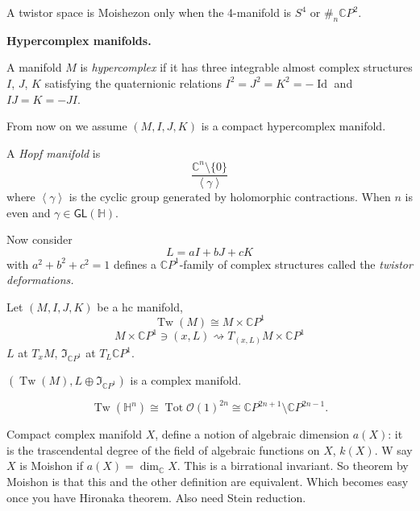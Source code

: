 \begin{theorem}[F. Campana]
\label{theorem-tw-campana}
A twistor space is Moishezon only when the
4-manifold is $S^4$ or $\#_n\mathbb{C}P^{2}$.
\end{theorem}

\medskip\noindent
{\bf Hypercomplex manifolds.}

\begin{definition}
\label{definition-tw-hypercomplex}
A manifold $M$ is {\it hypercomplex} if it
has three integrable almost complex
structures $I$, $J$, $K$ satisfying the
quaternionic relations
$I^2=J^2=K^2=-\operatorname{Id}$ and $I
J=K=-J I$.
\end{definition}

From now on we assume $(M,I,J,K)$ is a
compact hypercomplex manifold.

\begin{example}
\label{example-tw-hopf}
A {\it Hopf manifold} is
$$
\frac{\mathbb{C}^n\setminus
\{0\}}{\left\langle{} \gamma\right\rangle{}}
$$
where $\left\langle{} \gamma\right\rangle{}$
is the cyclic group generated by holomorphic
contractions. When $n$ is even and
$\gamma\in\mathsf{GL}(\mathbb{H})$.
\end{example}

Now consider
$$
L=a I+b J + c K
$$
with $a^2+b^2+c^2=1$ defines a
$\mathbb{C}P^{1}$-family of complex
structures called the {\it twistor
deformations.}

\begin{definition}
\label{definition-tw-twistor-space}
Let $(M,I,J,K)$ be a hc manifold,
$$
\operatorname{Tw}(M)\cong M\times
\mathbb{C}P^{1}
$$
$$
M\times \mathbb{C}P^{1}
\ni(x,L)\rightsquigarrow T_{(x,L)}M\times
\mathbb{C}P^{1}
$$
$L$ at $T_xM$,
$\mathfrak{I}_{\mathbb{C}P^{1}}$ at
$T_L\mathbb{C}P^{1}$.
\end{definition}

\begin{theorem}
\label{theorem-tw-salamon}
$(\operatorname{Tw}(M),L\oplus
\mathfrak{I}_{\mathbb{C}P^{1}})$ is a complex
manifold.
\end{theorem}

\begin{example}[HKCR]
\label{example-tw-hkcr}
$$
\operatorname{Tw}(\mathbb{H}^n)\cong
\operatorname{Tot}\mathcal{O}(1)^{2n}\cong
\mathbb{C}P^{2n+1}\setminus
\mathbb{C}P^{2n-1}.
$$
\end{example}

Compact complex manifold $X$, define a notion
of algebraic dimension $a(X)$: it is the
trascendental degree of the field of
algebraic functions on $X$, $k(X)$. W say $X$
is Moishon if $a(X)=\dim_\mathbb{C}X$. This
is a birrational invariant. So theorem by
Moishon is that this and the other definition
are equivalent. Which becomes easy once you
have Hironaka theorem. Also need Stein
reduction.

